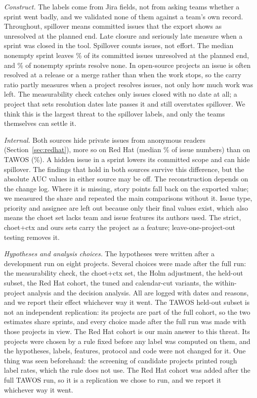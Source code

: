 \documentclass[journal]{IEEEtran}
\begin{document}
\emph{Construct.} The labels come from Jira fields, not from asking teams whether a sprint went badly, and we validated none of them against a team's own record. Throughout, spillover means committed issues that the export shows as unresolved at the planned end. Late closure and seriously late measure when a sprint was closed in the tool. Spillover counts issues, not effort. The median nonempty sprint leaves \CarryMedPct\% of its committed issues unresolved at the planned end, and \CleanNothingPct\% of nonempty sprints resolve none. In open-source projects an issue is often resolved at a release or a merge rather than when the work stops, so the carry ratio partly measures when a project resolves issues, not only how much work was left. The measurability check catches only issues closed with no date at all; a project that sets resolution dates late passes it and still overstates spillover. We think this is the largest threat to the spillover labels, and only the teams themselves can settle it.

\emph{Internal.} Both sources hide private issues from anonymous readers (Section~\ref{sec:redhat}), more so on Red Hat (median \GapRhMed\% of issue numbers) than on TAWOS (\GapTwMed\%). A hidden issue in a sprint lowers its committed scope and can hide spillover. The findings that hold in both sources survive this difference, but the absolute AUC values in either source may be off. The reconstruction depends on the change log. Where it is missing, story points fall back on the exported value; we measured the share and repeated the main comparisons without it. Issue type, priority and assignee are left out because only their final values exist, which also means the choet set lacks team and issue features its authors used. The strict, choet+ctx and ours sets carry the project as a feature; leave-one-project-out testing removes it.

\emph{Hypotheses and analysis choices.} The hypotheses were written after a development run on eight projects. Several choices were made after the full run: the measurability check, the choet+ctx set, the Holm adjustment, the held-out subset, the Red Hat cohort, the tuned and calendar-cut variants, the within-project analysis and the decision analysis. All are logged with dates and reasons, and we report their effect whichever way it went. The TAWOS held-out subset is not an independent replication: its \ConfProj{} projects are part of the full cohort, so the two estimates share \ConfSprints{} sprints, and every choice made after the full run was made with those projects in view. The Red Hat cohort is our main answer to this threat. Its projects were chosen by a rule fixed before any label was computed on them, and the hypotheses, labels, features, protocol and code were not changed for it. One thing was seen beforehand: the screening of candidate projects printed rough label rates, which the rule does not use. The Red Hat cohort was added after the full TAWOS run, so it is a replication we chose to run, and we report it whichever way it went.
\end{document}

